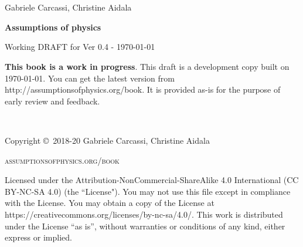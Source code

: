 \documentclass[11pt,letterpaper,fleqn]{memoir} %
\begin{document}
	





\frontmatter
\thispagestyle{empty} %

\newpage
\thispagestyle{empty}
~
\newpage

~
\thispagestyle{empty}

\vspace{20pt}

{\large \noindent Gabriele Carcassi, Christine Aidala }

\vspace{60pt}

{\Huge \noindent \textbf{Assumptions of physics}}

\vspace{30pt}

{\large \noindent Working DRAFT for Ver 0.4  - \today}

\vfill


\noindent \textbf{This book is a work in progress}. This draft is a development copy built on \today. You can get the latest version from http://assumptionsofphysics.org/book. It is provided as-is for the purpose of early review and feedback. 

\newpage
~\vfill
\thispagestyle{empty}

\noindent Copyright \copyright\ 2018-20 Gabriele Carcassi, Christine Aidala

\vspace{12pt}

\noindent \textsc{assumptionsofphysics.org/book}

\vspace{12pt}

\noindent Licensed under the Attribution-NonCommercial-ShareAlike 4.0 International (CC BY-NC-SA 4.0) (the ``License"). You may not use this file except in compliance with the License. You may obtain a copy of the License at https://creativecommons.org/licenses/by-nc-sa/4.0/. This work is distributed under the License ``as is'', without warranties or conditions of any kind, either express or implied.
\end{document}
